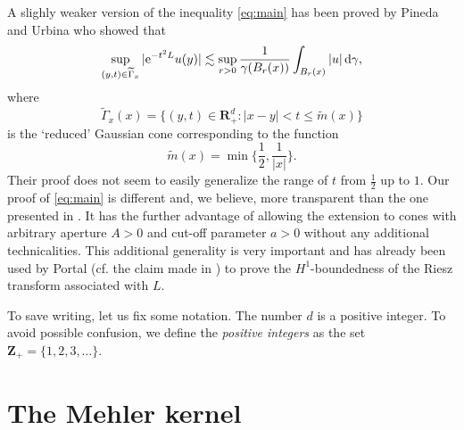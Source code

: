 \documentclass{amsart}
\theoremstyle{remark}
\newcommand{\D}{\,\textup{d}}
\renewcommand{\leq}{\leqslant}
\renewcommand{\leq}{\leqslant}
\newcommand{\R}{\mathbf R}
\newcommand{\Z}{\mathbf Z}
\newcommand{\e}{\mathrm{e}} %
\renewcommand{\leq}{\leqslant}%
\begin{document}
A slighly weaker version of the inequality \eqref{eq:main} has been proved by 
Pineda and Urbina \cite{Pineda2008} who showed that 
\begin{equation*}
  \sup_{(y, t) \in \widetilde{\Gamma}_x} |\e^{-t^2 L} u(y)|
  \lesssim \sup_{r > 0}  \frac1{\gamma(B_r(x))}\int_{B_r(x)} |u| \D\gamma,
\end{equation*}
where
\begin{equation*}
  \widetilde{\Gamma}_x(x) = \{(y, t) \in \R^d_+ : |x - y| < t \leq
  \widetilde{m}(x)\}
\end{equation*}
is the `reduced' Gaussian cone corresponding to the function
\begin{equation*}
  \widetilde{m}(x) = \min\biggl\{\frac12, \frac1{|x|}\biggr\}.
\end{equation*}
Their proof does not seem to easily generalize the range of $t$ from $\frac12$ up
to $1$.
Our proof of \eqref{eq:main} is different and, we believe, more transparent 
than the one presented in \cite{Pineda2008}. It has the further advantage of allowing 
the extension to cones
with arbitrary aperture $A>0$ and cut-off parameter $a > 0$ without any
additional technicalities. This additional generality
is very important and has already been used by Portal (cf. 
the claim made in \cite[discussion preceding Lemma 2.3]{Portal2012}) to prove the 
$H^1$-boundedness of the Riesz transform associated with $L$.

To save writing, let us fix some notation. The number $d$ is a positive
integer. To avoid possible confusion, we define the \emph{positive integers} as
the set $\Z_+ = \{1, 2, 3, \dots\}$.


% 
% 
% 


\section{The Mehler kernel}
\end{document}
